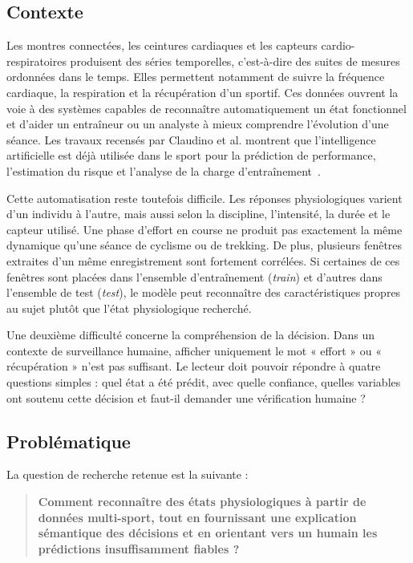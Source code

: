\documentclass[12pt,a4paper]{article}
\begin{document}
\subsection{Contexte}

Les montres connectées, les ceintures cardiaques et les capteurs
cardio-respiratoires produisent des séries temporelles, c'est-à-dire des suites
de mesures ordonnées dans le temps. Elles permettent notamment de suivre la
fréquence cardiaque, la respiration et la récupération d'un sportif. Ces
données ouvrent la voie à des systèmes capables de reconnaître
automatiquement un état fonctionnel et d'aider un entraîneur ou un analyste à
mieux comprendre l'évolution d'une séance. Les travaux recensés par Claudino
et al. montrent que l'intelligence artificielle est déjà utilisée dans le
sport pour la prédiction de performance, l'estimation du risque et l'analyse
de la charge d'entraînement~\cite{claudino2019}.

Cette automatisation reste toutefois difficile. Les réponses physiologiques
varient d'un individu à l'autre, mais aussi selon la discipline, l'intensité,
la durée et le capteur utilisé. Une phase d'effort en course ne produit pas
exactement la même dynamique qu'une séance de cyclisme ou de trekking. De
plus, plusieurs fenêtres extraites d'un même enregistrement sont fortement
corrélées. Si certaines de ces fenêtres sont placées dans l'ensemble d'entraînement
(\emph{train}) et d'autres dans l'ensemble de test (\emph{test}), le modèle peut reconnaître des caractéristiques propres au
sujet plutôt que l'état physiologique recherché.

Une deuxième difficulté concerne la compréhension de la décision. Dans un
contexte de surveillance humaine, afficher uniquement le mot « effort » ou
« récupération » n'est pas suffisant. Le lecteur doit pouvoir répondre à
quatre questions simples : quel état a été prédit, avec quelle confiance,
quelles variables ont soutenu cette décision et faut-il demander une
vérification humaine ?

\subsection{Problématique}

La question de recherche retenue est la suivante :

\begin{quote}
\textbf{Comment reconnaître des états physiologiques à partir de données
multi-sport, tout en fournissant une explication sémantique des décisions et
en orientant vers un humain les prédictions insuffisamment fiables ?}
\end{quote}
\end{document}
